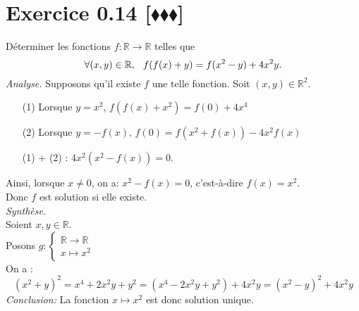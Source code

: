 \documentclass[10pt]{article}
\begin{document}
\section*{Exercice 0.14 [$\blacklozenge\blacklozenge\blacklozenge$]}
\begin{tcolorbox}[enhanced, width=7in, center, size=fbox, fontupper=\large, drop shadow southwest]
    Déterminer les fonctions $f: \mathbb{R} \rightarrow \mathbb{R}$ telles que 
    \begin{equation*}
        \forall{(x,y)\in\mathbb{R}}, \hspace{0.25cm} f(f(x)+y) = f(x^2-y)+4x^2y.
    \end{equation*}
    \emph{Analyse.}
    Supposons qu'il existe $f$ une telle fonction. Soit $(x,y)\in\mathbb{R}^2$. 
    \begin{itemize}
        \item[(1)] Lorsque $y=x^2$, $f(f(x)+x^2)=f(0)+4x^4$
        \item[(2)] Lorsque $y=-f(x)$, $f(0)=f(x^2+f(x))-4x^2f(x)$ 
        \item[(1)] + (2) : $4x^2(x^2 - f(x)) = 0$.
    \end{itemize}
    Ainsi, lorsque $x\neq0$, on a: $x^2-f(x) = 0$, c'est-à-dire $f(x)=x^2$.\\
    Donc $f$ est solution si elle existe.\\[0.2cm]
    \emph{Synthèse.}\\
    Soient $x,y\in\mathbb{R}$.\\
    Posons $g:\begin{cases}\mathbb{R}\rightarrow\mathbb{R}\\x\mapsto x^2\end{cases}$\\
    On a :
    \begin{equation*}
        (x^2+y)^2 = x^4 + 2x^2y + y^2 = (x^4-2x^2y+y^2)+4x^2y=(x^2-y)^2+4x^2y
    \end{equation*}
    \emph{Conclusion:}
    La fonction $x\mapsto x^2$ est donc solution unique.
\end{tcolorbox}
\end{document}
